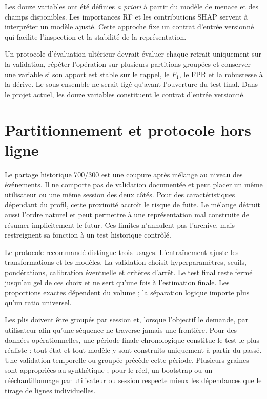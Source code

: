 \documentclass[11pt,a4paper,oneside]{report}
\theoremstyle{definition}
\theoremstyle{plain}
\begin{document}
Les douze variables ont été définies \emph{a priori} à partir du modèle de
menace et des champs disponibles. Les importances RF et les contributions SHAP
servent à interpréter un modèle ajusté. Cette approche fixe un contrat
d'entrée versionné qui facilite l'inspection et la stabilité de la
représentation.

Un protocole d'évaluation ultérieur devrait évaluer chaque retrait uniquement
sur la validation, répéter l'opération sur plusieurs partitions groupées et
conserver une variable si son apport est stable sur le rappel, le $F_1$, le FPR
et la robustesse à la dérive. Le sous-ensemble ne serait figé qu'avant
l'ouverture du test final. Dans le projet actuel, les douze variables
constituent le contrat d'entrée versionné.

\section{Partitionnement et protocole hors ligne}

Le partage historique 700/300 est une coupure après mélange au niveau des
événements. Il ne comporte pas de validation documentée et peut placer un même
utilisateur ou une même session des deux côtés. Pour des caractéristiques
dépendant du profil, cette proximité accroît le risque de fuite. Le mélange
détruit aussi l'ordre naturel et peut permettre à une représentation mal
construite de résumer implicitement le futur. Ces limites n'annulent pas
l'archive, mais restreignent sa fonction à un test historique contrôlé.

Le protocole recommandé distingue trois usages. L'entraînement ajuste les
transformations et les modèles. La validation choisit hyperparamètres, seuils,
pondérations, calibration éventuelle et critères d'arrêt. Le test final reste
fermé jusqu'au gel de ces choix et ne sert qu'une fois à l'estimation finale.
Les proportions exactes dépendent du volume ; la séparation logique importe
plus qu'un ratio universel.

Les plis doivent être groupés par session et, lorsque l'objectif le demande,
par utilisateur afin qu'une séquence ne traverse jamais une frontière. Pour des
données opérationnelles, une période finale chronologique constitue le test le
plus réaliste : tout état et tout modèle y sont construits uniquement à partir
du passé. Une validation temporelle ou groupée précède cette période. Plusieurs
graines sont appropriées au synthétique ; pour le réel, un bootstrap ou un
rééchantillonnage par utilisateur ou session respecte mieux les dépendances que
le tirage de lignes individuelles.
\end{document}
